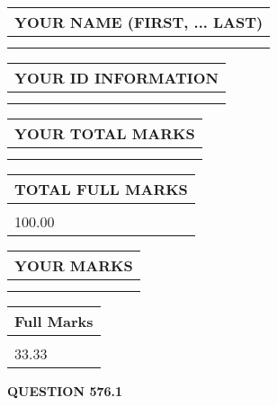 \documentclass{ctexart}
\begin{document}
   
   
   
\newpage 
\setcounter{page}{ 
   576001 } 
   
   
   
   
\noindent\begin{tabular}{|l|}
\hline
YOUR NAME (FIRST, ... LAST)  \\
\hline
 \\ 
 \\ 
\hline
\end{tabular}
\hspace{0.05in} \begin{tabular}{|l|}
\hline
 YOUR   ID   INFORMATION  \\
\hline
 \\ 
 \\ 
\hline
\end{tabular}
   
   
\vspace{0.2in}\noindent\begin{tabular}{|l|}
\hline
YOUR TOTAL MARKS  \\
\hline
 \\ 
 \\ 
\hline
\end{tabular}
\hspace{0.05in} \begin{tabular}{|l|}
\hline
TOTAL FULL MARKS  \\
\hline
 \\ 
100.00 \\
\hline
\end{tabular}
   
   
 \vspace{0.2in}
 
 
 
 
   
   
  
\vspace{0.2in}
  
\noindent\begin{tabular}{|l|}
\hline
 YOUR MARKS  \\
\hline
 \\ 
 \\ 
\hline
\end{tabular}
\hspace{0.05in} \begin{tabular}{|l|}
\hline
 Full Marks  \\
\hline
 \\ 
33.33 \\
\hline
\end{tabular}
{\textbf{\Large{QUESTION
576.1 
}}}
  
\end{document}
